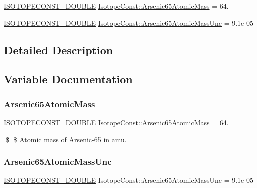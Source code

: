 \begin{DoxyCompactItemize}
\item 
\mbox{\hyperlink{group___isotope_const-_macros_ga8f45a7272ce02c0b4c65c44636ed719a}{I\+S\+O\+T\+O\+P\+E\+C\+O\+N\+S\+T\+\_\+\+D\+O\+U\+B\+LE}} \mbox{\hyperlink{group___isotope_const-_arsenic-_as65_ga2a7ed33b0f5f5bf21c4bc228c3343af1}{Isotope\+Const\+::\+Arsenic65\+Atomic\+Mass}} = 64.
\item 
\mbox{\hyperlink{group___isotope_const-_macros_ga8f45a7272ce02c0b4c65c44636ed719a}{I\+S\+O\+T\+O\+P\+E\+C\+O\+N\+S\+T\+\_\+\+D\+O\+U\+B\+LE}} \mbox{\hyperlink{group___isotope_const-_arsenic-_as65_gaf8e3d032b0534c4854a065ffe55162a5}{Isotope\+Const\+::\+Arsenic65\+Atomic\+Mass\+Unc}} = 9.\+1e-\/05
\end{DoxyCompactItemize}


\subsection{Detailed Description}


\subsection{Variable Documentation}
\mbox{\label{group___isotope_const-_arsenic-_as65_ga2a7ed33b0f5f5bf21c4bc228c3343af1}} 
\subsubsection{\texorpdfstring{Arsenic65\+Atomic\+Mass}{Arsenic65AtomicMass}}
{\footnotesize\ttfamily \mbox{\hyperlink{group___isotope_const-_macros_ga8f45a7272ce02c0b4c65c44636ed719a}{I\+S\+O\+T\+O\+P\+E\+C\+O\+N\+S\+T\+\_\+\+D\+O\+U\+B\+LE}} Isotope\+Const\+::\+Arsenic65\+Atomic\+Mass = 64.}

\$ \$ Atomic mass of Arsenic-\/65 in amu. \mbox{\label{group___isotope_const-_arsenic-_as65_gaf8e3d032b0534c4854a065ffe55162a5}} 
\subsubsection{\texorpdfstring{Arsenic65\+Atomic\+Mass\+Unc}{Arsenic65AtomicMassUnc}}
{\footnotesize\ttfamily \mbox{\hyperlink{group___isotope_const-_macros_ga8f45a7272ce02c0b4c65c44636ed719a}{I\+S\+O\+T\+O\+P\+E\+C\+O\+N\+S\+T\+\_\+\+D\+O\+U\+B\+LE}} Isotope\+Const\+::\+Arsenic65\+Atomic\+Mass\+Unc = 9.\+1e-\/05}

